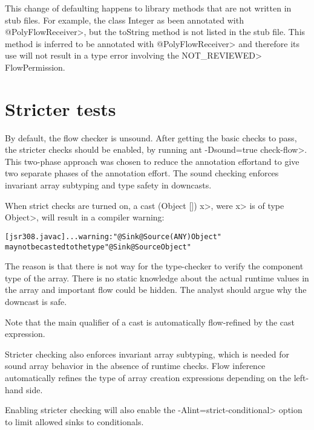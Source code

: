 This change of defaulting happens to library methods that are not written in stub files.  For example, the class
 Integer as been annotated with  \<@PolyFlowReceiver>, but the toString method is not listed in the stub file.  
 This method is inferred to be annotated with  \<@PolyFlowReceiver> and therefore its use will not result in a 
 type error  involving the \<NOT\_REVIEWED> FlowPermission. 
 






\section{Stricter tests\label{sec:stricter}}

By default, the flow checker is unsound.  After getting the basic checks to pass, the
 stricter checks should be enabled, by running \<ant -Dsound=true check-flow>.
This two-phase approach was chosen to reduce
the annotation effortand to give two separate phases of
the annotation effort.
 The sound checking enforces invariant 
array subtyping and type safety in downcasts.


When strict checks are turned on,
a cast \<(Object []) x>, were \<x> is of type \<Object>, will result
in a compiler warning:

\begin{alltt}
[jsr308.javac] ... warning: "@Sink @Source({ANY}) Object"
       may not be casted to the type "@Sink @Source Object"
\end{alltt}

The reason is that there is not way for the type-checker to verify
 the component type of the array. There is no static knowledge about the actual
runtime values in the array and important flow could be hidden.
The analyst should argue why the downcast is safe.

Note that the main qualifier of a cast is automatically flow-refined
by the cast expression.


\medskip

Stricter checking also enforces invariant array subtyping, which is
needed for sound array behavior in the absence of runtime checks.
Flow inference automatically refines the type of array creation
expressions depending on the left-hand side.

\medskip

Enabling stricter checking will also enable the \<-Alint=strict-conditional> option to limit 
allowed sinks to conditionals.

